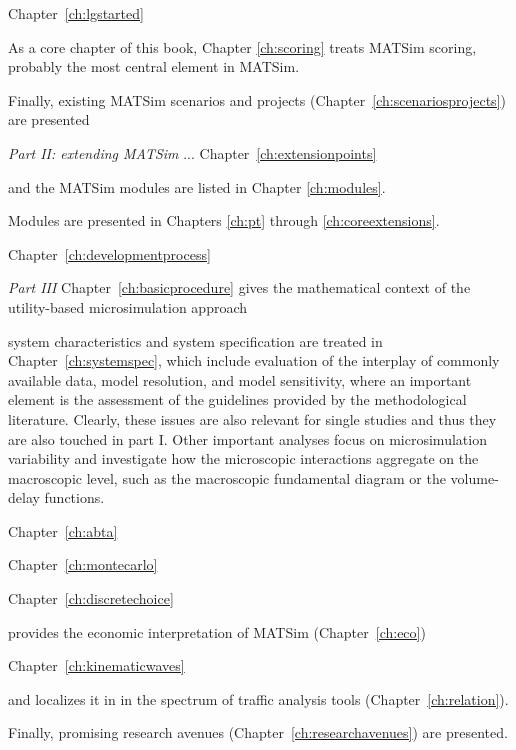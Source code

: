 Chapter~\ref{ch:lgstarted}

As a core chapter of this book, Chapter \ref{ch:scoring} treats MATSim scoring, probably the most central element in MATSim. 

Finally, existing MATSim scenarios and projects (Chapter~\ref{ch:scenariosprojects}) are presented 

\emph{Part II: extending MATSim} ...
Chapter~\ref{ch:extensionpoints}

and the MATSim modules are listed in Chapter \ref{ch:modules}.

Modules are presented in Chapters \ref{ch:pt} through \ref{ch:coreextensions}.

Chapter~\ref{ch:developmentprocess} 

\emph{Part III}
Chapter~\ref{ch:basicprocedure} gives the mathematical context of the utility-based microsimulation approach

system characteristics and system specification are treated in Chapter~\ref{ch:systemspec}, which include evaluation of the interplay of commonly available data, model resolution, and model sensitivity, where an important element is the assessment of the guidelines provided by the methodological literature. Clearly, these issues are also relevant for single studies and thus they are also touched in part I. Other important analyses focus on microsimulation variability and investigate how the microscopic interactions aggregate on the macroscopic level, such as the macroscopic fundamental diagram or the volume-delay functions.

Chapter~\ref{ch:abta}

Chapter~\ref{ch:montecarlo}

Chapter~\ref{ch:discretechoice}


provides the economic interpretation of MATSim (Chapter~\ref{ch:eco}) 

Chapter~\ref{ch:kinematicwaves}

and localizes it in in the spectrum of traffic analysis tools (Chapter~\ref{ch:relation}). 



Finally, promising research avenues (Chapter~\ref{ch:researchavenues}) are presented.



